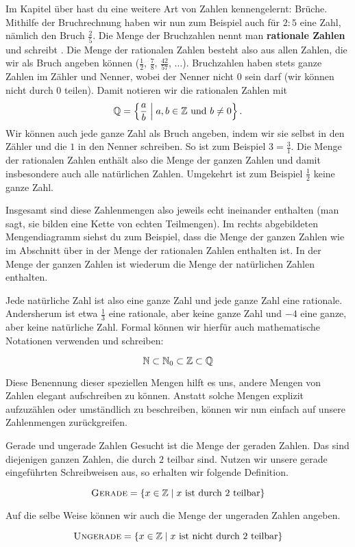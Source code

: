 \documentclass[../../main.tex]{subfiles}
\begin{document}
	Im Kapitel über  hast du eine weitere Art von Zahlen kennengelernt: Brüche. Mithilfe der Bruchrechnung haben wir nun zum Beispiel auch für $2 : 5$ eine Zahl, nämlich den Bruch $\frac{2}{5}$. Die Menge der Bruchzahlen nennt man \textbf{rationale Zahlen} und schreibt \Rational. Die Menge der rationalen Zahlen besteht also aus allen Zahlen, die wir als Bruch angeben können ($\frac{1}{2}$, $\frac{7}{8}$, $\frac{42}{57}$, $\ldots$). Bruchzahlen haben stets ganze Zahlen im Zähler und Nenner, wobei der Nenner nicht 0 sein darf (wir können nicht durch 0 teilen). Damit notieren wir die rationalen Zahlen mit
	\[\mathbb{Q} = \left\{\frac{a}{b} \;\middle|\; a, b \in \mathbb{Z} \text{ und } b \neq 0\right\}.\]
	Wir können auch jede ganze Zahl als Bruch angeben, indem wir sie selbst in den Zähler und die $1$ in den Nenner schreiben. So ist zum Beispiel $3 = \frac{3}{1}$. Die Menge der rationalen Zahlen enthält also die Menge der ganzen Zahlen und damit insbesondere auch alle natürlichen Zahlen. Umgekehrt ist zum Beispiel $\frac{1}{2}$ keine ganze Zahl.
	
	Insgesamt sind diese Zahlenmengen also jeweils echt ineinander enthalten (man sagt, sie bilden eine Kette von echten Teilmengen). Im rechts abgebildeten Mengendiagramm siehst du zum Beispiel, dass die Menge der ganzen Zahlen wie im Abschnitt über  in der Menge der rationalen Zahlen enthalten ist. In der Menge der ganzen Zahlen ist wiederum die Menge der natürlichen Zahlen enthalten. 
	
	Jede natürliche Zahl ist also eine ganze Zahl und jede ganze Zahl eine rationale. Andersherum ist etwa $\frac{1}{3}$ eine rationale, aber keine ganze Zahl und $-4$ eine ganze, aber keine natürliche Zahl. Formal können wir hierfür auch mathematische Notationen verwenden und schreiben:
	
	\[\mathbb{N} \subset \mathbb{N}_0 \subset \mathbb{Z} \subset \mathbb{Q}\]
	
	Diese Benennung dieser speziellen Mengen hilft es uns, andere Mengen von Zahlen elegant aufschreiben zu können. Anstatt solche Mengen explizit aufzuzählen oder umständlich zu beschreiben, können wir nun einfach auf unsere Zahlenmengen zurückgreifen.

	\begin{example}{Gerade und ungerade Zahlen}
		Gesucht ist die Menge der geraden Zahlen. Das sind diejenigen ganzen Zahlen, die durch $2$ teilbar sind. Nutzen wir unsere gerade eingeführten Schreibweisen aus, so erhalten wir folgende Definition.
		
		\[\textsc{Gerade} = \left\{x\in\mathbb{Z} \mid x \text{ ist durch $2$ teilbar}\right\}\]
		
		Auf die selbe Weise können wir auch die Menge der ungeraden Zahlen angeben.
		
		\[\textsc{Ungerade} = \left\{x\in\mathbb{Z} \mid x \text{ ist nicht durch $2$ teilbar}\right\}\]
	\end{example}
	
\end{document}
